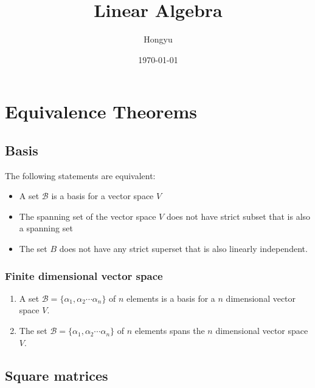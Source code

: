 \documentclass{book}
\title{Linear Algebra}
\author{Hongyu}
\date{\today}
\theoremstyle{remark}
\theoremstyle{definition}
\begin{document}
\chapter{Equivalence Theorems}
\section{Basis}
The following statements are equivalent:
\begin{itemize}
    \item A set $\mathcal{B}$ is a basis for a vector space $V$
    \item The spanning set of the vector space $V$     does not have strict subset that is also a spanning set
    \item The set $B$ does not have any strict superset that is also linearly independent. 
\end{itemize}
\subsection{Finite dimensional vector space}
\begin{enumerate}
    \item A set $\mathcal{B} = \{\alpha_1, \alpha_2 \cdots \alpha_n \}$ of $n$ elements is a basis for a $n$ dimensional vector space $V$. 
    \item \label{span} The set $\mathcal{B} = \{\alpha_1, \alpha_2 \cdots \alpha_n \}$ of $n$ elements spans the $n$ dimensional vector space $V$. 
\end{enumerate}


\section{Square matrices}
\end{document}
